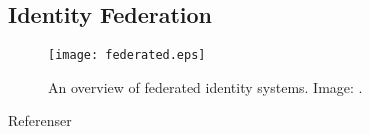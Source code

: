 \documentclass{beamer}
\begin{document}
\subsection{Identity Federation}

\begin{frame}{\insertsubsectionhead}
  \begin{figure}
    \texttt{[image: federated.eps]}
    \caption{An overview of federated identity systems.
      Image: \cite{Stallings2013nse}.
    }
  \end{figure}
\end{frame}



\begin{frame}[allowframebreaks]{Referenser}
	\small
  \printbibliography
\end{frame}
\end{document}
